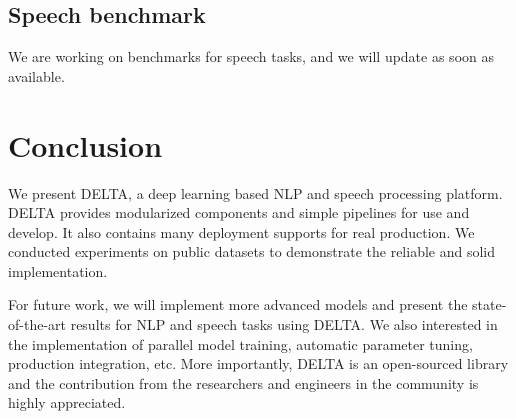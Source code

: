 \documentclass{article}
\begin{document}
\subsection{Speech benchmark}
We are working on benchmarks for speech tasks, and we will update as soon as available.






\section{Conclusion}
We present DELTA, a deep learning based NLP and speech processing platform. DELTA provides modularized components and simple pipelines for use and develop. It also contains many deployment supports for real production. We conducted experiments on public datasets to demonstrate the reliable and solid implementation.

For future work, we will implement more advanced models and present the state-of-the-art results for NLP and speech tasks using DELTA. We also interested in the implementation of parallel model training, automatic parameter tuning, production integration, etc. More importantly, DELTA is an open-sourced library and the contribution from the researchers and engineers in the community is highly appreciated.






\end{document}
